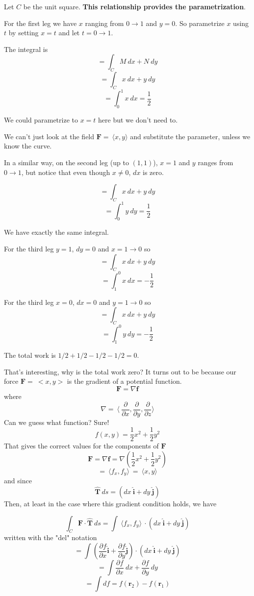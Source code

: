 \documentclass[11pt, oneside]{article}   	%
\begin{document}
Let $C$ be the unit square.  \textbf{This relationship provides the parametrization}.

For the first leg we have $x$ ranging from $0 \rightarrow 1$ and $y=0$.  So parametrize $x$ using $t$ by setting $x=t$ and let $t=0 \rightarrow 1$.

The integral is
\[ = \int_C M \ dx + N \ dy \]
\[ = \int_C x \ dx + y \ dy \]
\[ = \int_0^1 x \ dx = \frac{1}{2} \]

We could parametrize to $x = t$ here but we don't need to.

We can't just look at the field $\mathbf{F} = \ \langle x,y \rangle$ and substitute the parameter, unless we know the curve.

In a similar way, on the second leg (up to $(1,1)$), $x=1$ and $y$ ranges from $0 \rightarrow 1$, but notice that even though $x \ne 0$, $dx$ is zero.

\[ = \int_C x \ dx + y \ dy \]
\[ = \int_0^1 y \ dy = \frac{1}{2} \]

We have exactly the same integral.

For the third leg $y = 1$, $dy = 0$ and $x = 1 \rightarrow 0$ so
\[ = \int_C x \ dx + y \ dy \]
\[ = \int_1^0 x \ dx = - \frac{1}{2} \]

For the third leg $x = 0$, $dx = 0$ and $y = 1 \rightarrow 0$ so
\[ = \int_C x \ dx + y \ dy \]
\[ = \int_1^0 y \ dy = - \frac{1}{2} \]

 The total work is $1/2 + 1/2  - 1/2 - 1/2 = 0$.

That's interesting, why is the total work zero?  It turns out to be because our force $\mathbf{F} = \ <x,y>$ is the gradient of a potential function.  
\[ \mathbf{F} = \nabla \mathbf{f} \]
where
\[ \nabla = \ \langle \ \frac{\partial }{\partial  x},\frac{\partial }{\partial  y},\frac{\partial }{\partial  z} \rangle  \]
Can we guess what function? Sure!
\[ f(x,y) = \frac{1}{2}x^2 + \frac{1}{2}y^2 \]
That gives the correct values for the components of $\mathbf{F}$
\[ \mathbf{F} = \nabla \mathbf{f} = \nabla ( \frac{1}{2}x^2 + \frac{1}{2}y^2) \]
\[ = \ \langle  f_x,f_y \rangle  \ = \ \langle  x,y \rangle  \]
and since 
\[  \hat{\mathbf{T}} \ ds = (dx\ \hat{\mathbf{i}} + dy\ \hat{\mathbf{j}}) \]
Then, at least in the case where this gradient condition holds, we have

\[ \int_C \mathbf{F} \cdot  \hat{\mathbf{T}} \ ds  =  \int \ \langle  f_x,f_y \rangle  \  \cdot  (dx\ \hat{\mathbf{i}} + dy\ \hat{\mathbf{j}})  \] 
written with the "del" notation
\[= \int (\frac{\partial f}{\partial  x} \hat{\mathbf{i}} + \frac{\partial f}{\partial  y} \hat{\mathbf{j}}) \cdot (dx\ \hat{\mathbf{i}} + dy\ \hat{\mathbf{j}}) \]
\[ =\int \frac{\partial f}{\partial  x} \ dx + \frac{\partial f}{\partial  y} \ dy \]
\[ = \int df = f(\mathbf{r}_2) - f(\mathbf{r}_1)  \]
\end{document}
